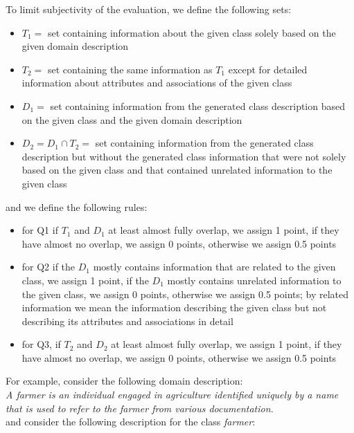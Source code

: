 \noindent{}To limit subjectivity of the evaluation, we define the following sets:

\begin{itemize}
\item $T_1 =$ set containing information about the given class solely based on the given domain description
\item $T_2 =$ set containing the same information as $T_1$ except for detailed information about attributes and associations of the given class
\item $D_1 =$ set containing information from the generated class description based on the given class and the given domain description
\item $D_2 = D_1 \cap T_2 =$ set containing information from the generated class description but without the generated class information that were not solely based on the given class and that contained unrelated information to the given class
\end{itemize}

\noindent{}and we define the following rules:
\begin{itemize}
\item for Q1 if $T_1$ and $D_1$ at least almost fully overlap, we assign 1 point, if they have almost no overlap, we assign 0 points, otherwise we assign 0.5 points
\item for Q2 if the $D_1$ mostly contains information that are related to the given class, we assign 1 point, if the $D_1$ mostly contains unrelated information to the given class, we assign 0 points, otherwise we assign 0.5 points; by related information we mean the information describing the given class but not describing its attributes and associations in detail
\item for Q3, if $T_2$ and $D_2$ at least almost fully overlap, we assign 1 point, if they have almost no overlap, we assign 0 points, otherwise we assign 0.5 points
\end{itemize}


\noindent{}For example, consider the following domain description: \\

\noindent{}\textit{A farmer is an individual engaged in agriculture identified uniquely by a name that is used to refer to the farmer from various documentation.} \\

\noindent{}and consider the following description for the class \textit{farmer}: \\


